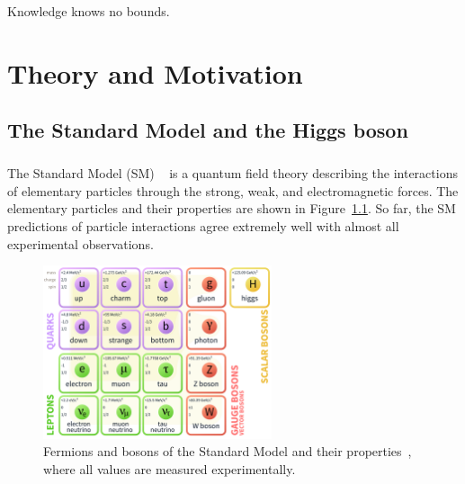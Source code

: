 \begin{savequote}[75mm]
Knowledge knows no bounds.
\end{savequote}

\chapter{Theory and Motivation}

\section{The Standard Model and the Higgs boson}
\paragraph{}
The Standard Model (SM) ~\cite{Pdg,Griffiths,Tully,Schwartz} is a quantum field theory describing the interactions of elementary particles through the strong, weak, and electromagnetic forces. 
The elementary particles and their properties are shown in Figure~\ref{fig:SM}. 
So far, the SM predictions of particle interactions agree extremely well with almost all experimental observations.

\begin{figure}[htbp!]
  \centering
  \captionsetup{justification=centering}
  \includegraphics[width=0.6\textwidth]{figures/theory/SM}
  \caption{Fermions and bosons of the Standard Model and their properties~\cite{Pdg}, where all  values are measured experimentally.}
  \label{fig:SM}
\end{figure}

